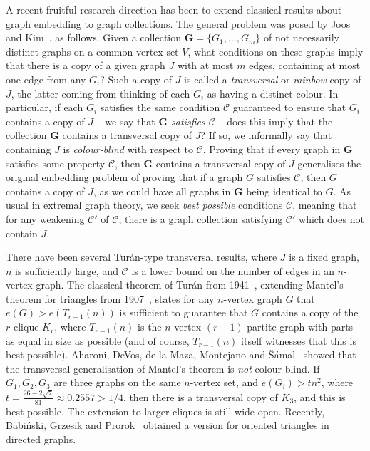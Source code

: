 \documentclass[11pt, dvipsnames]{amsart}
\theoremstyle{plain}
\theoremstyle{definition}
\newcommand{\mc}[1]{\mathcal{#1}}
\newcommand{\mbf}[1]{\mathbf{#1}}
\begin{document}
A recent fruitful research direction has been to extend classical results about graph embedding to graph collections. The general problem was posed by Joos and Kim~\cite{jooskim}, as follows. Given a collection $\mathbf{G}=\{G_1,\ldots,G_m\}$ of not necessarily distinct graphs on a common vertex set $V$, what conditions on these graphs imply that there is a copy of a given graph $J$ with at most $m$ edges, containing at most one edge from any $G_i$? 
 Such a copy of $J$ is called a \emph{transversal} or \emph{rainbow} copy of $J$, the latter coming from thinking of each $G_i$ as having a distinct colour.
In particular, if each $G_i$ satisfies the same condition $\mc{C}$ guaranteed to ensure that $G_i$ contains a copy of $J$ -- we say that \emph{$\mathbf{G}$ satisfies $\mc{C}$} -- does this imply that the collection $\mathbf{G}$ contains a transversal copy of $J$?
If so, we informally say that containing $J$ is \emph{colour-blind} with respect to $\mc{C}$. 
Proving that if every graph in $\mathbf{G}$ satisfies some property $\mc{C}$, then $\mathbf{G}$ contains a transversal copy of $J$ generalises the original embedding problem of proving that if a graph $G$ satisfies $\mc{C}$, then $G$ contains a copy of $J$, as we could have all graphs in $\mbf G$ being identical to $G$.
As usual in extremal graph theory, we seek \emph{best possible} conditions $\mc{C}$, meaning that for any weakening $\mc{C}'$ of $\mc{C}$, there is a graph collection satisfying $\mc{C}'$ which does not contain $J$.

There have been several Tur\'an-type transversal results, where $J$ is a fixed graph, $n$ is sufficiently large, and $\mc{C}$ is a lower bound on the number of edges in an $n$-vertex graph.
The classical theorem of Tur\'an from 1941~\cite{turan}, extending Mantel's theorem for triangles from 1907~\cite{mantel}, states for any $n$-vertex graph $G$ that $e(G) > e(T_{r-1}(n))$ is sufficient to guarantee that $G$ contains a copy of the $r$-clique $K_r$, where $T_{r-1}(n)$ is the $n$-vertex $(r-1)$-partite graph with parts as equal in size as possible (and of course, $T_{r-1}(n)$ itself witnesses that this is best possible).
Aharoni, DeVos, de la Maza, Montejano and \v{S}\'amal~\cite{Aharoni} showed that the transversal generalisation of Mantel's theorem is \emph{not} colour-blind. If $G_1,G_2,G_3$ are three graphs on the same $n$-vertex set, and $e(G_i)> tn^2$, where 
$t=\frac{26-2\sqrt{7}}{81} \approx 0.2557 > 1/4$, then there is a transversal copy of $K_3$, and this is best possible. The extension to larger cliques is still wide open. Recently, Babi\'nski, Grzesik and Prorok~\cite{bgp} obtained a version for oriented triangles in directed graphs.
\end{document}
